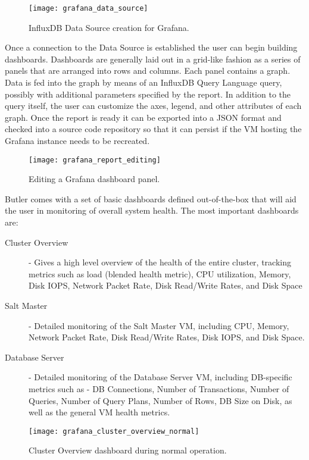 \begin{figure}[h]
\texttt{[image: grafana\_data\_source]}
\centering
\caption {InfluxDB Data Source creation for Grafana.}
\label{fig:grafana_data_source}
\end{figure}

Once a connection to the Data Source is established the user can begin building dashboards. Dashboards are generally laid out in a grid-like fashion as a series of panels that are arranged into rows and columns. Each panel contains a graph. Data is fed into the graph by means of an InfluxDB Query Language query, possibly with additional parameters specified by the report.  In addition to the query itself, the user can customize the axes, legend, and other attributes of each graph. Once the report is ready it can be exported into a JSON format and checked into a source code repository so that it can persist if the VM hosting the Grafana instance needs to be recreated.

\begin{figure}[h]
\texttt{[image: grafana\_report\_editing]}
\centering
\caption {Editing a Grafana dashboard panel.}
\label{fig:grafana_report_editing}
\end{figure}
\newpage
Butler comes with a set of basic dashboards defined out-of-the-box that will aid the user in monitoring of overall system health. The most important dashboards are:

\begin{description}
\item [Cluster Overview] - Gives a high level overview of the health of the entire cluster, tracking metrics such as load (blended health metric), CPU utilization, Memory, Disk IOPS, Network Packet Rate, Disk Read/Write Rates, and Disk Space
\item [Salt Master] - Detailed monitoring of the Salt Master VM, including CPU, Memory, Network Packet Rate, Disk Read/Write Rates, Disk IOPS, and Disk Space.
\item [Database Server] - Detailed monitoring of the Database Server VM, including DB-specific metrics such as - DB Connections, Number of Transactions, Number of Queries, Number of Query Plans, Number of Rows, DB Size on Disk, as well as the general VM health metrics.
\end{description}

\begin{figure}[h]
\texttt{[image: grafana\_cluster\_overview\_normal]}
\centering
\caption {Cluster Overview dashboard during normal operation.}
\label{fig:grafana_cluster_overview_normal}
\end{figure}

